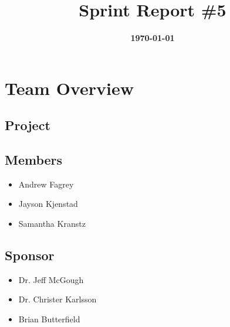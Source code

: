 \documentclass{article}
\title{\normalfont\Large\bfseries\color{TitleColor}Sprint Report \#5}
\date{\normalfont\bfseries\color{TitleColor}\today}
\begin{document}
\maketitle

\section*{Team Overview}
\subsection*{Project}

\subsection*{Members}
\begin{itemize}
	\item Andrew Fagrey
	\item Jayson Kjenstad
	\item Samantha Kranstz
\end{itemize}

\subsection*{Sponsor}
\begin{itemize}
	\item Dr. Jeff McGough
	\item Dr. Christer Karlsson
	\item Brian Butterfield
\end{itemize}
\end{document}
